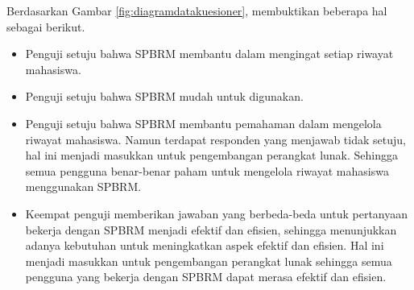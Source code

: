 Berdasarkan Gambar \ref{fig:diagramdatakuesioner}, membuktikan beberapa hal sebagai berikut.
\begin{itemize}
\item Penguji setuju bahwa SPBRM membantu dalam mengingat setiap riwayat mahasiswa.
\item Penguji setuju bahwa SPBRM mudah untuk digunakan.
\item Penguji setuju bahwa SPBRM membantu pemahaman dalam mengelola riwayat mahasiswa. Namun terdapat responden yang menjawab tidak setuju, hal ini menjadi masukkan untuk pengembangan perangkat lunak. Sehingga semua pengguna benar-benar paham untuk mengelola riwayat mahasiswa menggunakan SPBRM.
\item Keempat penguji memberikan jawaban yang berbeda-beda untuk pertanyaan bekerja dengan SPBRM menjadi efektif dan efisien, sehingga menunjukkan adanya kebutuhan untuk meningkatkan aspek efektif dan efisien. Hal ini menjadi masukkan untuk pengembangan perangkat lunak sehingga semua pengguna yang bekerja dengan SPBRM dapat merasa efektif dan efisien.
\end{itemize}